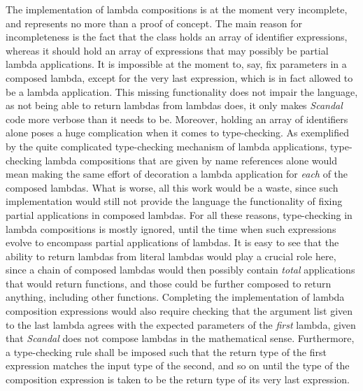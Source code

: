 The implementation of lambda compositions is at the moment very incomplete, and represents no more than a proof of concept. The main reason for incompleteness is the fact that the  class holds an array of identifier expressions, whereas it should hold an array of expressions that may possibly be partial lambda applications. It is impossible at the moment to, say, fix parameters in a composed lambda, except for the very last expression, which is in fact allowed to be a lambda application. This missing functionality does not impair the language, as not being able to return lambdas from lambdas does, it only makes \emph{Scandal} code more verbose than it needs to be. Moreover, holding an array of identifiers alone poses a huge complication when it comes to type-checking. As exemplified by the quite complicated type-checking mechanism of lambda applications, type-checking lambda compositions that are given by name references alone would mean making the same effort of decoration a lambda application for \emph{each} of the composed lambdas. What is worse, all this work would be a waste, since such implementation would still not provide the language the functionality of fixing partial applications in composed lambdas. For all these reasons, type-checking in lambda compositions is mostly ignored, until the time when such expressions evolve to encompass partial applications of lambdas. It is easy to see that the ability to return lambdas from literal lambdas would play a crucial role here, since a chain of composed lambdas would then possibly contain \emph{total} applications that would return functions, and those could be further composed to return anything, including other functions. Completing the implementation of lambda composition expressions would also require checking that the argument list given to the last lambda agrees with the expected parameters of the \emph{first} lambda, given that \emph{Scandal} does not compose lambdas in the mathematical sense. Furthermore, a type-checking rule shall be imposed such that the return type of the first expression matches the input type of the second, and so on until the type of the composition expression is taken to be the return type of its very last expression.